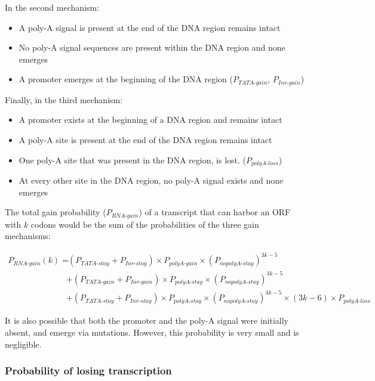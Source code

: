 \documentclass[12pt,a4paper]{article}
\begin{document}
\vspace{\baselineskip}
In the second mechanism:
\begin{itemize}
\item A poly-A signal is present at the end of the DNA region remains intact 
\item No poly-A signal sequences are present within the DNA region and none emerges
\item A promoter emerges at the beginning of the DNA region ($P_\textit{TATA-gain}$, $P_\textit{Inr-gain}$)
\end{itemize}

\vspace{\baselineskip}
Finally, in the third mechanism:
\begin{itemize}
\item A promoter exists at the beginning of a DNA region and remains intact
\item A poly-A site is present at the end of the DNA region remains intact
\item One poly-A site that was present in the DNA region, is lost. ($P_\textit{polyA-loss}$)
\item At every other site in the DNA region, no poly-A signal exists and none emerges
\end{itemize}


The total gain probability ($P_\textit{RNA-gain}$) of a transcript that can harbor an ORF with $k$ codons  would be the sum of the probabilities of the three gain mechanisms:

\begin{align}
P_\textit{RNA-gain}(k)  = & \ (P_\textit{TATA-stay} + P_\textit{Inr-stay})\times P_\textit{polyA-gain}\times (P_\textit{nopolyA-stay})^{3k-5} \nonumber\\[1ex]
%
& + (P_\textit{TATA-gain} + P_\textit{Inr-gain})\times P_\textit{polyA-stay}\times (P_\textit{nopolyA-stay})^{3k-5} \nonumber \\[1ex]
& + (P_\textit{TATA-stay} + P_\textit{Inr-stay})\times P_\textit{polyA-stay}\times (P_\textit{nopolyA-stay})^{3k-5} \times (3k-6) \times P_\textit{polyA-loss}
\label{eqrnagain}
\end{align}

It is also possible that both the promoter and the poly-A signal were initially absent, and emerge via mutations. However, this probability is very small and is negligible.


\subsubsection{Probability of losing transcription}
\end{document}
